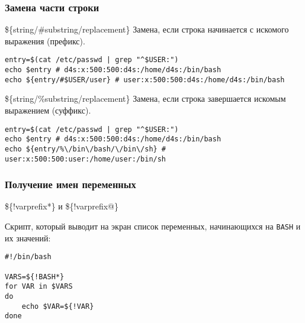 \begin{frame}[fragile]
	\frametitle{Замена части строки}

	\begin{block}{\$\{string/\#substring/replacement\}}
		Замена, если строка начинается с искомого выражения (префикс).

	\begin{lstlisting}
entry=$(cat /etc/passwd | grep "^$USER:")
echo $entry # d4s:x:500:500:d4s:/home/d4s:/bin/bash
echo ${entry/#$USER/user} # user:x:500:500:d4s:/home/d4s:/bin/bash
\end{lstlisting}
	\end{block}

	\pause
	\begin{block}{\$\{string/\%substring/replacement\}}
		Замена, если строка завершается искомым выражением (суффикс).

	\begin{lstlisting}
entry=$(cat /etc/passwd | grep "^$USER:")
echo $entry # d4s:x:500:500:d4s:/home/d4s:/bin/bash
echo ${entry/%\/bin\/bash/\/bin\/sh} # user:x:500:500:user:/home/user:/bin/sh
\end{lstlisting}
	\end{block}

\end{frame}

\begin{frame}[fragile]
	\frametitle{Получение имен переменных}

	\begin{block}{ \$\{!varprefix*\} и \$\{!varprefix@\} }

		Скрипт, который выводит на экран список переменных, начинающихся на {\tt BASH} и их значений:
	\begin{lstlisting}
#!/bin/bash

VARS=${!BASH*}
for VAR in $VARS
do
    echo $VAR=${!VAR}
done
\end{lstlisting}
	\end{block}
\end{frame}

